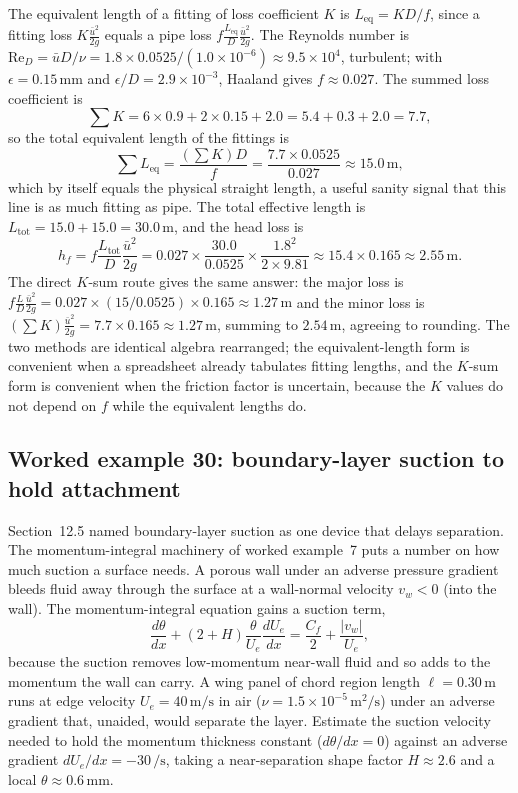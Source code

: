 The equivalent length of a fitting of loss coefficient $K$ is
$L_{\text{eq}} = K D/f$, since a fitting loss $K\tfrac{\bar u^2}{2g}$
equals a pipe loss $f\tfrac{L_{\text{eq}}}{D}\tfrac{\bar u^2}{2g}$. The
Reynolds number is $\text{Re}_D = \bar u D/\nu = 1.8\times0.0525/
(1.0\times10^{-6}) \approx 9.5\times10^{4}$, turbulent; with $\epsilon =
0.15\,\si{\milli\meter}$ and $\epsilon/D = 2.9\times10^{-3}$, Haaland
gives $f\approx0.027$. The summed loss coefficient is
\[
\sum K = 6\times0.9 + 2\times0.15 + 2.0 = 5.4 + 0.3 + 2.0 = 7.7,
\]
so the total equivalent length of the fittings is
\[
\sum L_{\text{eq}} = \frac{\left(\sum K\right)D}{f} = \frac{7.7\times
0.0525}{0.027} \approx 15.0\,\si{\meter},
\]
which by itself equals the physical straight length, a useful sanity
signal that this line is as much fitting as pipe. The total effective
length is $L_{\text{tot}} = 15.0 + 15.0 = 30.0\,\si{\meter}$, and the
head loss is
\[
h_f = f\frac{L_{\text{tot}}}{D}\frac{\bar u^2}{2g} = 0.027\times
\frac{30.0}{0.0525}\times\frac{1.8^2}{2\times9.81} \approx 15.4\times
0.165 \approx 2.55\,\si{\meter}.
\]
The direct $K$-sum route gives the same answer: the major loss is
$f\tfrac{L}{D}\tfrac{\bar u^2}{2g} = 0.027\times(15/0.0525)\times0.165
\approx 1.27\,\si{\meter}$ and the minor loss is $(\sum K)\tfrac{\bar
u^2}{2g} = 7.7\times0.165 \approx 1.27\,\si{\meter}$, summing to
$2.54\,\si{\meter}$, agreeing to rounding. The two methods are
identical algebra rearranged; the equivalent-length form is convenient
when a spreadsheet already tabulates fitting lengths, and the $K$-sum
form is convenient when the friction factor is uncertain, because the
$K$ values do not depend on $f$ while the equivalent lengths do.

\subsection*{Worked example 30: boundary-layer suction to hold attachment}

Section~12.5 named boundary-layer suction as one device that delays
separation. The momentum-integral machinery of worked example~7 puts a
number on how much suction a surface needs. A porous wall under an
adverse pressure gradient bleeds fluid away through the surface at a
wall-normal velocity $v_w < 0$ (into the wall). The momentum-integral
equation gains a suction term,
\[
\frac{d\theta}{dx} + (2 + H)\frac{\theta}{U_e}\frac{dU_e}{dx} =
\frac{C_f}{2} + \frac{|v_w|}{U_e},
\]
because the suction removes low-momentum near-wall fluid and so adds to
the momentum the wall can carry. A wing panel of chord region length
$\ell = 0.30\,\si{\meter}$ runs at edge velocity $U_e = 40\,\si{\meter
\per\second}$ in air ($\nu = 1.5\times10^{-5}\,\si{\meter}^2/\si{
\second}$) under an adverse gradient that, unaided, would separate the
layer. Estimate the suction velocity needed to hold the momentum
thickness constant ($d\theta/dx = 0$) against an adverse gradient
$dU_e/dx = -30\,\si{\per\second}$, taking a near-separation shape
factor $H\approx2.6$ and a local $\theta\approx0.6\,\si{\milli\meter}$.

